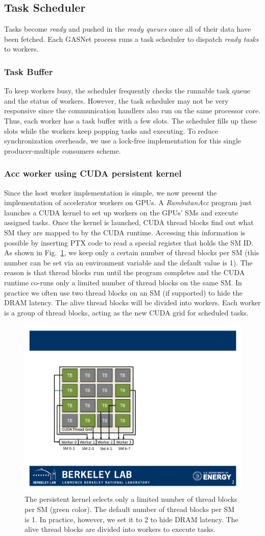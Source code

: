 \subsection{Task Scheduler}
Tasks become {\em ready} and pushed in the {\em ready queues} once all of their data have been fetched.
Each GASNet process runs a task scheduler to dispatch {\em ready tasks} to workers. 

\subsubsection{Task Buffer}
To keep workers busy, the scheduler frequently checks the runnable task queue and the status of workers.
However, the task scheduler may not be very responsive since the communication handlers also run on the same processor core.
Thus, each worker has a task buffer with a few slots.
The scheduler fills up these slots while the workers keep popping tasks and executing.
To reduce synchronization overheads, we use a lock-free implementation for this single producer-multiple consumers scheme.

\subsubsection{Acc worker using CUDA persistent kernel}
Since the host worker implementation is simple, we now present the implementation of accelerator workers on GPUs.
A {\em RambutanAcc} program just launches a CUDA kernel to set up workers on the GPUs' SMs and execute assigned tasks.
Once the kernel is launched, CUDA thread blocks find out what SM they are mapped to by the CUDA runtime.
Accessing this information is possible by inserting PTX code to read a special register that holds the SM ID.
As shown in Fig.~\ref{fig:kernel}, we keep only a certain number of thread blocks per SM (this number can be set via an environment variable and the default value is 1).
The reason is that thread blocks run until the program completes and the CUDA runtime co-runs only a limited number of thread blocks on the same SM.
In practice we often use two thread blocks on an SM (if supported) to hide the DRAM latency.
The alive thread blocks will be divided into workers.
Each worker is a group of thread blocks, acting as the new CUDA grid for scheduled tasks.

\begin{figure}[htb]
\centering
\includegraphics[width=.35\textwidth]{figures/kernel_init.pdf}
\caption{The persistent kernel selects only a limited number of thread blocks per SM (green color). The default number of thread blocks per SM is 1. 
In practice, however, we set it to 2 to hide DRAM latency.
The alive thread blocks are divided into workers to execute tasks.}
\label{fig:kernel}
\end{figure}

